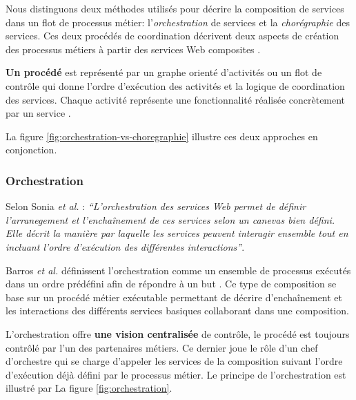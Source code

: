 

    Nous distinguons deux méthodes utilisés pour décrire la
    composition de services dans un flot de processus métier:
    l'\emph{orchestration} de services et la \emph{chorégraphie} des
    services. Ces deux procédés de coordination décrivent deux aspects
    de création des processus métiers à partir des services Web
    composites \cite{peltz2003web}.
    
    \textbf{Un procédé} est représenté par un graphe orienté
    d'activités ou un flot de contrôle qui donne l'ordre d'exécution
    des activités et la logique de coordination des services. Chaque
    activité représente une fonctionnalité réalisée concrètement par
    un service \cite{chollet2009orchestration}.

    La figure \ref{fig:orchestration-vs-choregraphie} illustre ces
    deux approches en conjonction.
           

      \subsubsection{Orchestration}
      \label{sec:orchestration-sec}
      Selon Sonia \emph{et al.} \cite{jamal2005environnement}:
      \emph{``L'orchestration des services Web permet de définir
        l'arranegement et l'enchaînement de ces services selon un
        canevas bien défini. Elle décrit la manière par laquelle les
        services peuvent interagir ensemble tout en incluant l'ordre
        d'exécution des différentes interactions''}.

      Barros \emph{et al.} \cite{barros2006standards} définissent
      l'orchestration comme un ensemble de processus exécutés dans un
      ordre prédéfini afin de répondre à un but
      \cite{lopez2008selection}. Ce type de composition se base sur un
      procédé métier exécutable permettant de décrire d'enchaînement
      et les interactions des différents services basiques collaborant
      dans une composition.
      
      L'orchestration offre \textbf{une vision centralisée} de
      contrôle, le procédé est toujours contrôlé par l'un des
      partenaires métiers. Ce dernier joue le rôle d'un chef
      d'orchestre qui se charge d'appeler les services de la
      composition suivant l'ordre d'exécution déjà défini par le
      processus métier. Le principe de l'orchestration est illustré
      par La figure \ref{fig:orchestration}.

